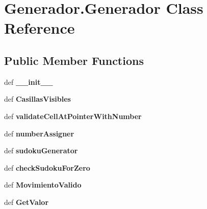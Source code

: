 \hypertarget{class_generador_1_1_generador}{\section{Generador.\-Generador Class Reference}
\label{class_generador_1_1_generador}
}
\subsection*{Public Member Functions}
\begin{DoxyCompactItemize}
\item 
\hypertarget{class_generador_1_1_generador_a7653a28c2b949a33513e269c80fce22a}{def {\bfseries \-\_\-\-\_\-init\-\_\-\-\_\-}}\label{class_generador_1_1_generador_a7653a28c2b949a33513e269c80fce22a}

\item 
\hypertarget{class_generador_1_1_generador_ab5129fee0d088ea23d9fd2a85a73506d}{def {\bfseries Casillas\-Visibles}}\label{class_generador_1_1_generador_ab5129fee0d088ea23d9fd2a85a73506d}

\item 
\hypertarget{class_generador_1_1_generador_aef145f37afe0cb9cd9cd6832c0f8ccd9}{def {\bfseries validate\-Cell\-At\-Pointer\-With\-Number}}\label{class_generador_1_1_generador_aef145f37afe0cb9cd9cd6832c0f8ccd9}

\item 
\hypertarget{class_generador_1_1_generador_ae5ece4fd0d0526f261ee964587f5bd83}{def {\bfseries number\-Assigner}}\label{class_generador_1_1_generador_ae5ece4fd0d0526f261ee964587f5bd83}

\item 
\hypertarget{class_generador_1_1_generador_af4c2ef52fe2543bdfea778a5a7e6ee7f}{def {\bfseries sudoku\-Generator}}\label{class_generador_1_1_generador_af4c2ef52fe2543bdfea778a5a7e6ee7f}

\item 
\hypertarget{class_generador_1_1_generador_a96ddfcf197c4b980dacdcad5c52cc5eb}{def {\bfseries check\-Sudoku\-For\-Zero}}\label{class_generador_1_1_generador_a96ddfcf197c4b980dacdcad5c52cc5eb}

\item 
\hypertarget{class_generador_1_1_generador_afe624fd14668a68697dd8be2c9bddbe1}{def {\bfseries Movimiento\-Valido}}\label{class_generador_1_1_generador_afe624fd14668a68697dd8be2c9bddbe1}

\item 
\hypertarget{class_generador_1_1_generador_ab817a51c7982e956a6a1d6e40bae9e60}{def {\bfseries Get\-Valor}}\label{class_generador_1_1_generador_ab817a51c7982e956a6a1d6e40bae9e60}


\end{DoxyCompactItemize}
